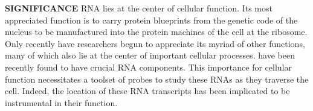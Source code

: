 
\textbf{SIGNIFICANCE}
RNA lies at the center of cellular function. Its most appreciated function is to carry protein blueprints from the genetic code of the nucleus to be manufactured into the protein machines of the cell at the ribosome. Only recently have researchers begun to appreciate its myriad of other functions, many of which also lie at the center of important cellular processes.  have been recently found to have crucial RNA components. This importance for cellular function necessitates a toolset of probes to study these RNAs as they traverse the cell. Indeed, the location of these RNA transcripts has been implicated to be instrumental in their function.\cite{Muller-McNicollHowcellsget2013a}

